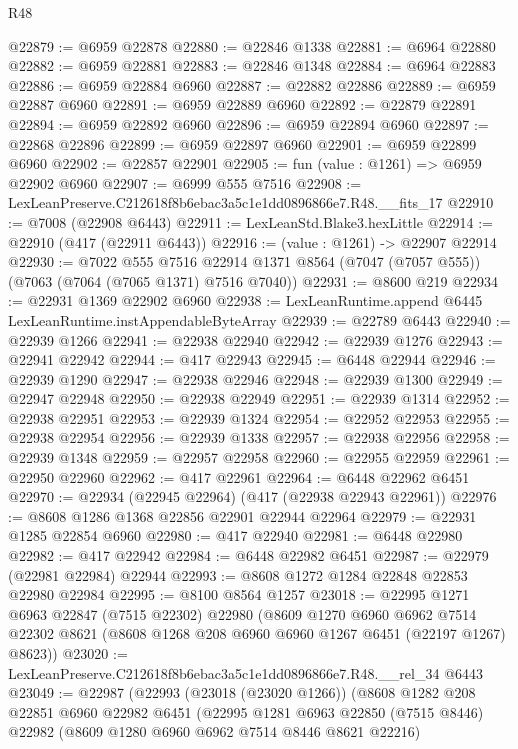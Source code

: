 \begin{lexlean}{R48}
\begin{coremodule}
@22879 := @6959 @22878
@22880 := @22846 @1338
@22881 := @6964 @22880
@22882 := @6959 @22881
@22883 := @22846 @1348
@22884 := @6964 @22883
@22886 := @6959 @22884 @6960
@22887 := @22882 @22886
@22889 := @6959 @22887 @6960
@22891 := @6959 @22889 @6960
@22892 := @22879 @22891
@22894 := @6959 @22892 @6960
@22896 := @6959 @22894 @6960
@22897 := @22868 @22896
@22899 := @6959 @22897 @6960
@22901 := @6959 @22899 @6960
@22902 := @22857 @22901
@22905 := fun (value : @1261) => @6959 @22902 @6960
@22907 := @6999 @555 @7516
@22908 := LexLeanPreserve.C212618f8b6ebac3a5c1e1dd0896866e7.R48.__fits_17
@22910 := @7008 (@22908 @6443)
@22911 := LexLeanStd.Blake3.hexLittle
@22914 := @22910 (@417 (@22911 @6443))
@22916 := (value : @1261) -> @22907 @22914
@22930 := @7022
    @555
    @7516
    @22914
    @1371
    @8564
    (@7047 (@7057 @555))
    (@7063 (@7064 (@7065 @1371) @7516 @7040))
@22931 := @8600 @219
@22934 := @22931 @1369 @22902 @6960
@22938 := LexLeanRuntime.append @6445 LexLeanRuntime.instAppendableByteArray
@22939 := @22789 @6443
@22940 := @22939 @1266
@22941 := @22938 @22940
@22942 := @22939 @1276
@22943 := @22941 @22942
@22944 := @417 @22943
@22945 := @6448 @22944
@22946 := @22939 @1290
@22947 := @22938 @22946
@22948 := @22939 @1300
@22949 := @22947 @22948
@22950 := @22938 @22949
@22951 := @22939 @1314
@22952 := @22938 @22951
@22953 := @22939 @1324
@22954 := @22952 @22953
@22955 := @22938 @22954
@22956 := @22939 @1338
@22957 := @22938 @22956
@22958 := @22939 @1348
@22959 := @22957 @22958
@22960 := @22955 @22959
@22961 := @22950 @22960
@22962 := @417 @22961
@22964 := @6448 @22962 @6451
@22970 := @22934 (@22945 @22964) (@417 (@22938 @22943 @22961))
@22976 := @8608 @1286 @1368 @22856 @22901 @22944 @22964
@22979 := @22931 @1285 @22854 @6960
@22980 := @417 @22940
@22981 := @6448 @22980
@22982 := @417 @22942
@22984 := @6448 @22982 @6451
@22987 := @22979 (@22981 @22984) @22944
@22993 := @8608 @1272 @1284 @22848 @22853 @22980 @22984
@22995 := @8100 @8564 @1257
@23018 := @22995
    @1271
    @6963
    @22847
    (@7515 @22302)
    @22980
    (@8609
      @1270
      @6960
      @6962
      @7514
      @22302
      @8621
      (@8608 @1268 @208 @6960 @6960 @1267 @6451 (@22197 @1267) @8623))
@23020 := LexLeanPreserve.C212618f8b6ebac3a5c1e1dd0896866e7.R48.__rel_34 @6443
@23049 := @22987
    (@22993
      (@23018 (@23020 @1266))
      (@8608
        @1282
        @208
        @22851
        @6960
        @22982
        @6451
        (@22995
          @1281
          @6963
          @22850
          (@7515 @8446)
          @22982
          (@8609 @1280 @6960 @6962 @7514 @8446 @8621 @22216)

\end{coremodule}
\end{lexlean}
